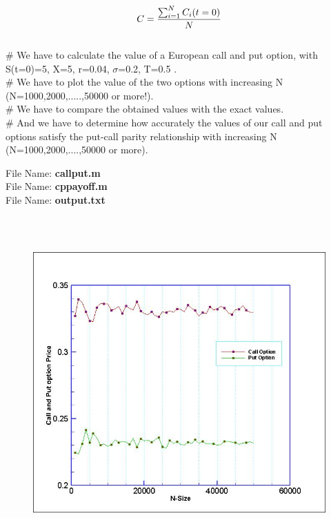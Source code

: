 \documentclass[14pt,a4paper]{article}
\begin{document}
	\begin{equation}
	C=\frac{\sum_{i=1}^N C_i(t=0)}{N}\\
	\end{equation}
	\\
	[1in]
	\# We have to calculate the value of a European call and put option, with S(t=0)=5, X=5, r=0.04, $\sigma$=0.2, T=0.5 .\\
	\# We have to plot the value of the two options with increasing N (N=1000,2000,.....,50000 or more!).\\
	\# We have to compare the obtained values with the exact values.\\
	\# And we have to determine how accurately the values of our call and put options satisfy the put-call parity relationship with increasing N (N=1000,2000,....,50000 or more). \\
	[1in]
	

\Large{File Name: {\bf callput.m}}\\
    
\vspace{1in}
\Large{File Name: {\bf cppayoff.m}}\\

\vspace{1in}
\Large{File Name: {\bf output.txt}}\\



\begin{figure}[H]
\centering
\includegraphics[height=5in]{figure1.jpeg}
\end{figure}
	
\end{document}
